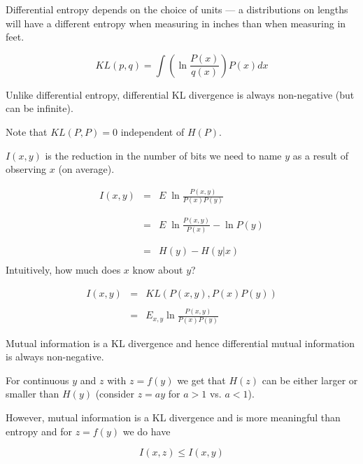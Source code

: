 \vfill
Differential entropy depends on the choice of units --- a distributions on lengths will have a different entropy
when measuring in inches than when measuring in feet.


$$KL(p,q) = \int \left( \ln \frac{P(x)}{q(x)}\right) P(x) dx$$

\vfill
Unlike differential entropy, differential KL divergence is always non-negative (but can be infinite).

\vfill
Note that $KL(P,P) = 0$ independent of $H(P)$.


$I(x,y)$ is the reduction in the number of bits we need to name $y$ as a result of observing $x$ (on average).

{\huge
\begin{eqnarray*}
I(x,y) & = & E \;\ln \frac{P(x,y)}{P(x)P(y)} \\
\\
\\
& = & E \;\ln \frac{P(x,y)}{P(x)} - \ln P(y) \\
\\
\\
& = & H(y) - H(y|x) \\
\end{eqnarray*}
}
Intuitively, how much does $x$ know about $y$?


\begin{eqnarray*}
  I(x,y) & = & KL(P(x,y),P(x)P(y)) \\
  \\
  & = & E_{x,y} \ln \frac{P(x,y)}{P(x)P(y)}
\end{eqnarray*}

\vfill
Mutual information is a KL divergence and hence differential mutual information is always non-negative.


For continuous $y$ and $z$ with $z = f(y)$ we get that $H(z)$ can be either larger or smaller than $H(y)$ (consider $z = ay$ for $a >1$ vs. $a<1$).

\vfill
However, mutual information is a KL divergence and is more meaningful than entropy and for $z = f(y)$ we do have

$$I(x,z) \leq I(x,y)$$


